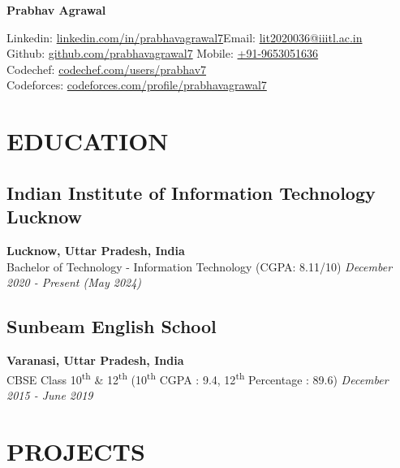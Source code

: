 \documentclass[12pt]{article}
\newcommand{\resumename}[1]{\LARGE\textbf{#1}\hfill\small}
\begin{document}
\resumename{Prabhav Agrawal} 
\vspace*{10pt}
 
Linkedin: 	\hspace*{0.50cm} \href{https://linkedin.com/in/prabhavagrawal7}{linkedin.com/in/prabhavagrawal7}\hfill Email: \href{mailto:lit2020036@iiitl.ac.in}{lit2020036@iiitl.ac.in} \\
Github:		\hspace*{0.77cm} \href{https://github.com/prabhavagrawal7}{github.com/prabhavagrawal7} \hfill Mobile: \href{tel:+919653051636}{+91-9653051636} \\
Codechef:	\hspace*{0.435cm} \href{https://codechef.com/users/prabhav7}{codechef.com/users/prabhav7}\\
Codeforces: \hspace*{0.13cm} \href{https://codeforces.com/profile/prabhavagrawal7}{codeforces.com/profile/prabhavagrawal7}
\section*{EDUCATION}
\subsection*{Indian Institute of Information Technology Lucknow}	\hfill\textbf{Lucknow, Uttar Pradesh, India} \\
Bachelor of Technology - Information Technology (CGPA: 8.11/10) 	\hfill\textit{December 2020 - Present (May 2024)} \\
\subsection*{Sunbeam English School}	\hfill\textbf{Varanasi, Uttar Pradesh, India} \\
CBSE Class 10\textsuperscript{th} \& 12\textsuperscript{th} (10\textsuperscript{th} CGPA : 9.4, 12\textsuperscript{th} Percentage : 89.6) \hfill \textit{December 2015 - June 2019} \\

\section*{PROJECTS}
\end{document}

